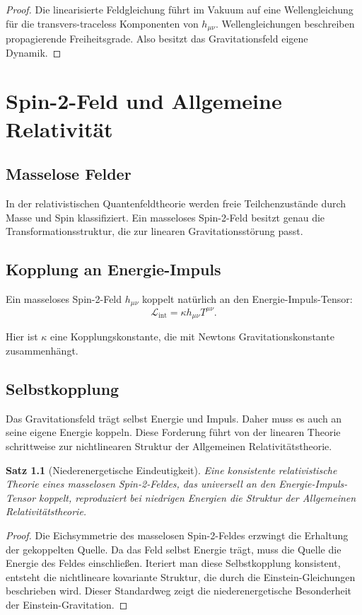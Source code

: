\documentclass[11pt,a4paper,oneside]{book}
\theoremstyle{definition}
\theoremstyle{plain}
\newtheorem{satz}[definition]{Satz}
\theoremstyle{remark}
\newcommand{\Lag}{\mathcal{L}}
\begin{document}
\begin{proof}
Die linearisierte Feldgleichung führt im Vakuum auf eine Wellengleichung für die transvers-traceless Komponenten von $h_{\mu\nu}$. Wellengleichungen beschreiben propagierende Freiheitsgrade. Also besitzt das Gravitationsfeld eigene Dynamik.
\end{proof}

\chapter{Spin-2-Feld und Allgemeine Relativität}
\section{Masselose Felder}
In der relativistischen Quantenfeldtheorie werden freie Teilchenzustände durch Masse und Spin klassifiziert. Ein masseloses Spin-2-Feld besitzt genau die Transformationsstruktur, die zur linearen Gravitationsstörung passt.

\section{Kopplung an Energie-Impuls}
Ein masseloses Spin-2-Feld $h_{\mu\nu}$ koppelt natürlich an den Energie-Impuls-Tensor:
\[
\Lag_{\text{int}} = \kappa h_{\mu\nu}T^{\mu\nu}.
\]

Hier ist $\kappa$ eine Kopplungskonstante, die mit Newtons Gravitationskonstante zusammenhängt.

\section{Selbstkopplung}
Das Gravitationsfeld trägt selbst Energie und Impuls. Daher muss es auch an seine eigene Energie koppeln. Diese Forderung führt von der linearen Theorie schrittweise zur nichtlinearen Struktur der Allgemeinen Relativitätstheorie.

\begin{satz}[Niederenergetische Eindeutigkeit]
Eine konsistente relativistische Theorie eines masselosen Spin-2-Feldes, das universell an den Energie-Impuls-Tensor koppelt, reproduziert bei niedrigen Energien die Struktur der Allgemeinen Relativitätstheorie.
\end{satz}

\begin{proof}
Die Eichsymmetrie des masselosen Spin-2-Feldes erzwingt die Erhaltung der gekoppelten Quelle. Da das Feld selbst Energie trägt, muss die Quelle die Energie des Feldes einschließen. Iteriert man diese Selbstkopplung konsistent, entsteht die nichtlineare kovariante Struktur, die durch die Einstein-Gleichungen beschrieben wird. Dieser Standardweg zeigt die niederenergetische Besonderheit der Einstein-Gravitation.
\end{proof}
\end{document}
